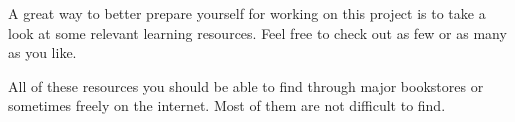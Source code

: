 

A great way to better prepare yourself for working on this project is to take a look at some relevant learning resources. Feel free to check out as few or as many as you like. 

All of these resources you should be able to find through major bookstores or sometimes freely on the internet. Most of them are not difficult to find.





\StopChapter

